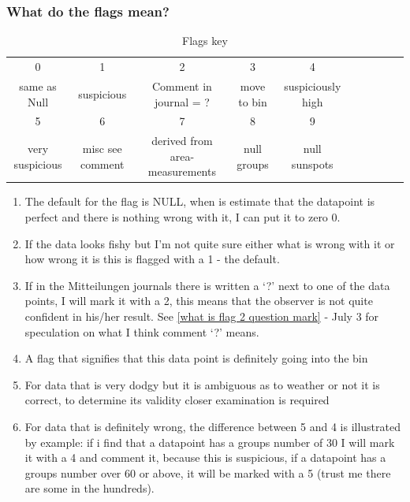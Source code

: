 \documentclass[12pt]{article}
\begin{document}
\subsubsection{What do the flags mean?}\label{flags section}
\newpage%
\begin{table}[h!]
    \centering
    \begin{tabular}{c|c|c|c|c|c|c|c|c|c}
        0 & 1 & 2 & 3 & 4 \\
        same as Null & suspicious & Comment in journal = ? & move to bin & suspiciously high\\
        \hline
        5 & 6 & 7 & 8 & 9\\
        very suspicious & misc see comment & derived from area-measurements & null groups & null sunspots
         
    \end{tabular}
    \caption{Flags key}
    \label{tab:flag}
\end{table}
\begin{enumerate}[start=0]
    \item The default for the flag is NULL, when is estimate that the datapoint is perfect and there is nothing wrong with it, I can put it to zero 0.
    \item If the data looks fishy but I'm not quite sure either what is wrong with it or how wrong it is this is flagged with a 1 - the default.
    \item If in the Mitteilungen journals there is written a `?' next to one of the data points, I will mark it with a 2, this means that the observer is not quite confident in his/her result. See \ref{what is flag 2 question mark} - July 3 for speculation on what I think comment `?' means.
    \item A flag that signifies that this data point is definitely going into the bin
    \item For data that is very dodgy but it is ambiguous as to weather or not it is correct, to determine its validity closer examination is required
    \item For data that is definitely wrong, the difference between 5 and 4 is illustrated by example: if i find that a datapoint has a groups number of 30 I will mark it with a 4 and comment it, because this is suspicious, if a datapoint has a groups number over 60 or above, it will be marked with a 5 (trust me there are some in the hundreds).
\end{enumerate}
  
\end{document}
